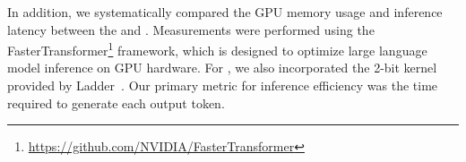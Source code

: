 In addition, we systematically compared the GPU memory usage and inference latency between the  and . Measurements were performed using the FasterTransformer\footnote{\url{https://github.com/NVIDIA/FasterTransformer}} framework, which is designed to optimize large language model inference on GPU hardware. For , we also incorporated the 2-bit kernel provided by Ladder~\cite{ladder}. Our primary metric for inference efficiency was the time required to generate each output token.